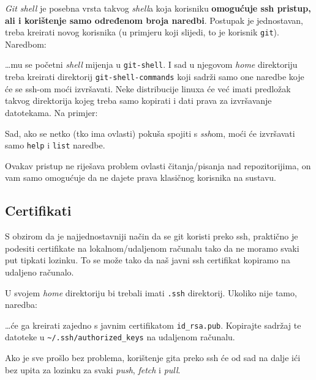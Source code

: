 \emph{Git shell} je posebna vrsta takvog \emph{shell}a koja korisniku \textbf{omogućuje ssh pristup, ali i korištenje samo određenom broja naredbi}.
Postupak je jednostavan, treba kreirati novog korisnika (u primjeru koji slijedi, to je korisnik \verb+git+).
Naredbom:


\dots{}mu se početni \emph{shell} mijenja u \verb+git-shell+.
I sad u njegovom \emph{home} direktoriju treba kreirati direktorij \verb+git-shell-commands+ koji sadrži samo one naredbe koje će se ssh-om moći izvršavati.
Neke distribucije linuxa će već imati predložak takvog direktorija kojeg treba samo kopirati i dati prava za izvršavanje datotekama.
Na primjer:


Sad, ako se netko (tko ima ovlasti) pokuša spojiti s \emph{ssh}om, moći će izvršavati samo \verb+help+ i \verb+list+ naredbe.

Ovakav pristup ne riješava problem ovlasti čitanja/pisanja nad repozitorijima, on vam samo omogućuje da ne dajete prava klasičnog korisnika na sustavu.

\subsection*{Certifikati}

S obzirom da je najjednostavniji način da se git koristi preko ssh, praktično je podesiti certifikate na lokalnom/udaljenom računalu tako da ne moramo svaki put tipkati lozinku.
To se može tako da naš javni ssh certifikat kopiramo na udaljeno računalo.

U svojem \emph{home} direktoriju bi trebali imati \verb+.ssh+ direktorij.
Ukoliko nije tamo, naredba:


\dots{}će ga kreirati zajedno s javnim certifikatom \verb+id_rsa.pub+.
Kopirajte sadržaj te datoteke u \verb+~/.ssh/authorized_keys+ na udaljenom računalu.

Ako je sve prošlo bez problema, korištenje gita preko ssh će od sad na dalje ići bez upita za lozinku za svaki \emph{push}, \emph{fetch} i \emph{pull}.

